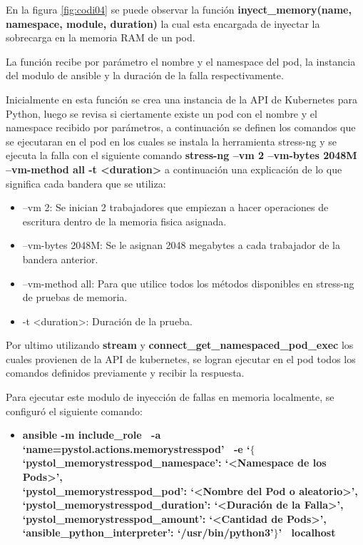 \par En la figura \ref{fig:codi04} se puede observar la función \textbf{ inyect\_memory(name, namespace, module, duration)} la cual esta encargada de inyectar la sobrecarga en la memoria RAM de un pod.\\
\par La función recibe por parámetro el nombre y el namespace del pod, la instancia del modulo de ansible y la duración de la falla respectivamente. \\
\par Inicialmente en esta función se crea una instancia de la API de Kubernetes para Python, luego se revisa si ciertamente existe un pod con el nombre y el namespace recibido por parámetros, a continuación se definen los comandos que se ejecutaran en el pod en los cuales se instala la herramienta stress-ng y se ejecuta la falla con el siguiente comando
\textbf{stress-ng --vm 2 --vm-bytes 2048M --vm-method all -t <duration> } a continuación una explicación de lo que significa cada bandera que se utiliza:
\begin{itemize}
        \item --vm 2: Se inician 2 trabajadores que empiezan a hacer operaciones de escritura dentro de la memoria fisica asignada.        
        \item --vm-bytes 2048M: Se le asignan 2048 megabytes a cada trabajador de la bandera anterior.
        \item --vm-method all: Para que utilice todos los métodos disponibles en stress-ng de pruebas de memoria.
        \item -t <duration>: Duración de la prueba.\\
    \end{itemize}

\par Por ultimo utilizando \textbf{stream} y \textbf{connect\_get\_namespaced\_pod\_exec} los cuales provienen de la API de kubernetes, se logran ejecutar en el pod todos los comandos definidos previamente y recibir la respuesta.\\

\par Para ejecutar este modulo de inyección de fallas en memoria localmente, se configur\'o el siguiente comando:
\begin{itemize}
    \item \textbf{ansible -m include\_role \ -a `name=pystol.actions.memorystresspod' \ -e `$\{$ \\
    `pystol\_memorystresspod\_namespace': `<Namespace de los Pods>', \\
    `pystol\_memorystresspod\_pod': `<Nombre del Pod o aleatorio>', \\
    `pystol\_memorystresspod\_duration': `<Duración de la Falla>', \\
    `pystol\_memorystresspod\_amount': `<Cantidad de Pods>', \\
    `ansible\_python\_interpreter': `/usr/bin/python3'$\}$' \ localhost} %
\end{itemize}




